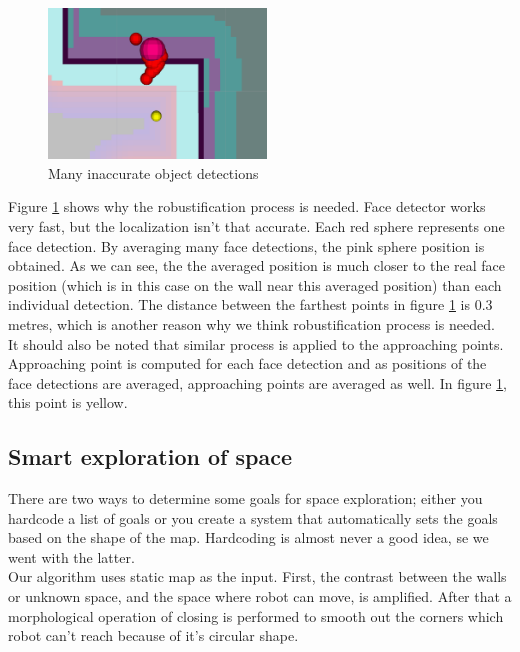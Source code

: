\documentclass[12pt,a4paper]{article}
\begin{document}
	\begin{figure}[h]
		\centering
		\includegraphics[height=4cm]{images/detections}
		\caption{Many inaccurate object detections}
		\label{fig:inaccurate_detections}
	\end{figure}

	Figure \ref{fig:inaccurate_detections} shows why the robustification process is needed. Face detector works very fast, but the localization isn't that accurate. Each red sphere represents one face detection. By averaging many face detections, the pink sphere position is obtained. As we can see, the the averaged position is much closer to the real face position (which is in this case on the wall near this averaged position) than each individual detection. The distance between the farthest points in figure \ref{fig:inaccurate_detections} is 0.3 metres, which is another reason why we think robustification process is needed. \\
	
	It should also be noted that similar process is applied to the approaching points. Approaching point is computed for each face detection and as positions of the face detections are averaged, approaching points are averaged as well. In figure \ref{fig:inaccurate_detections}, this point is yellow. \\
		
	\subsection{Smart exploration of space} \label{smart_exploration}
	There are two ways to determine some goals for space exploration; either you hardcode a list of goals or you create a system that automatically sets the goals based on the shape of the map. Hardcoding is almost never a good idea, se we went with the latter. \\

	Our algorithm uses static map as the input. First, the contrast between the walls or unknown space, and the space where robot can move, is amplified. After that a morphological operation of closing is performed to smooth out the corners which robot can't reach because of it's circular shape. \\
	
\end{document}
